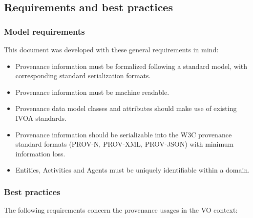\subsection{Requirements and best practices}
\label{sec:requirements}

\subsubsection{Model requirements}

This document was developed with these general requirements in mind:

\begin{itemize}


\item Provenance information must be formalized following a standard model, with corresponding standard serialization formats.

\item Provenance information must be machine readable.

\item Provenance data model classes and attributes should make use of existing IVOA standards.

\item Provenance information should be serializable into the W3C provenance standard formats (PROV-N, PROV-XML, PROV-JSON) with minimum information loss.

\item Entities, Activities and Agents must be uniquely identifiable within a domain.
\end{itemize}


\subsubsection{Best practices}

The following requirements concern the provenance usages in the VO context:

